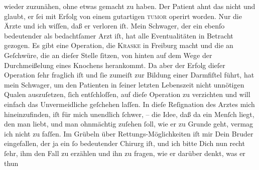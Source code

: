 \begin{ledgroupsized}[t]{13cm}
               wieder zuzunähen, ohne etwas gemacht zu haben. Der Patient ahnt das nicht und glaubt, er ſei
               mit Erfolg von einem gutartigen \textsc{tumor} operirt worden. Nur
               die Ärzte und ich wiſſen, daß er verloren iſt. {\pb}Mein
                  Schwager, der ein ebenſo
               bedeutender als bedachtſamer Arzt iſt, hat alle Eventualitäten in Betracht gezogen.
               Es gibt eine Operation, die \textsc{Kraske} in Freiburg macht und die an Geſchwüre, die
               an dieſer Stelle ſitzen, von hinten auf dem Wege der Durchmeißelung eines Knochens
               herankommt. Da aber der Erfolg dieſer Operation ſehr fraglich iſt und ſie zumeiſt zur
               Bildung einer Darmfiſtel führt, hat mein Schwager, um den Patienten in ſeiner letzten Lebenszeit nicht unnötigen Qualen
               auszuſetzen, ſich entſchloſſen, auf dieſe Operation zu verzichten und will einfach
               das Unvermeidliche geſchehen laſſen.\pend
           \pstart
           In dieſe Reſignation des Arztes {\pb}mich hineinzufinden, iſt für mich
               unendlich ſchwer, – die Idee, daß da ein Menſch liegt, den man liebt, und man  ohnmächtig zuſehen ſoll, wie er zu Grunde geht, vermag ich nicht zu faſſen. Im
               Grübeln über Rettungs-Möglichkeiten iſt mir Dein Bruder eingefallen, der ja ein ſo bedeutender Chirurg iſt,
               und ich bitte Dich nun recht ſehr, ihm  den Fall zu erzählen und ihn zu fragen, wie er darüber denkt, was er thun

\end{ledgroupsized}
